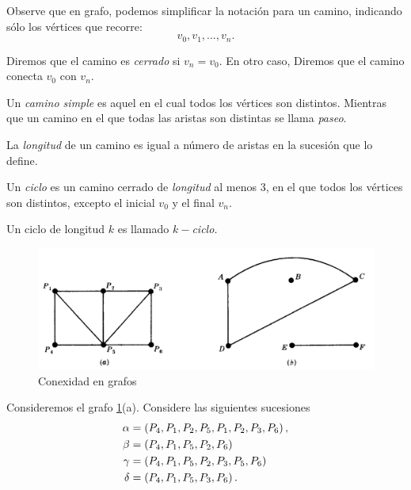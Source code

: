 	\begin{observacion}
		Observe que en grafo, podemos simplificar la notación para un camino, indicando sólo los v\'ertices que recorre:
		$$v_{0}, v_{1},..., v_{n}.$$ 
	\end{observacion}



	Diremos que el camino es \emph{cerrado} si $v_{n}=v_{0}.$ En otro caso, Diremos que el camino conecta $v_{0}$ con $v_{n}.$
	 
	
	Un \emph{camino simple} es aquel en el cual todos los v\'ertices son distintos. Mientras que un camino en el que todas las aristas son distintas se llama \emph{paseo}.
	



	La \emph{longitud} de un camino es igual a número de aristas en la sucesión que lo define.
	 



	Un \emph{ciclo} es un camino cerrado de \emph{longitud} al menos 3, en el que todos los v\'ertices son distintos, excepto el inicial $v_{0}$ y el final $v_{n}.$
	
	
	Un ciclo de longitud $k$ es llamado \emph{$k-$ciclo.}



	\begin{figure}[h!]
		\centering
		\includegraphics[width=10 cm,keepaspectratio=true]{./md/grafo_8_8.png}
		\caption{Conexidad en grafos}
		\label{fig:md0504}
	\end{figure}



	\begin{problema}
		\label{lip:exmp:8.1}
		Consideremos el grafo \ref{fig:md0504}(a). Considere las siguientes sucesiones
		\begin{align*}
			\alpha&=\left( P_{4}, P_{1}, P_{2}, P_{5}, P_{1},P_{2}, P_{3}, P_{6}  \right), \\
			\beta&=\left( P_{4}, P_{1}, P_{5}, P_{2}, P_{6} \right) \\
			\gamma&= \left( P_{4}, P_{1}, P_{5}, P_{2}, P_{3}, P_{5}, P_{6} \right)\\
			\delta&=\left( P_{4}, P_{1}, P_{5}, P_{3}, P_{6} \right).
		\end{align*}
		
	\end{problema}
	



